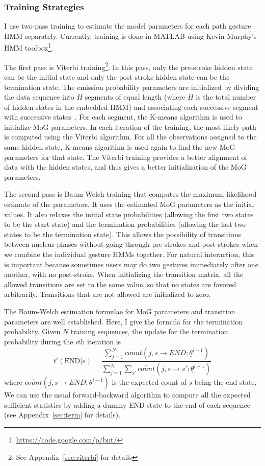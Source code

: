 \subsubsection{Training Strategies}
I use two-pass training to estimate the model parameters for each path
gesture HMM separately. Currently, training is done in MATLAB using Kevin
Murphy's HMM toolbox\footnote{\url{https://code.google.com/p/bnt/}}.

The first pass is Viterbi training\footnote{See Appendix~\ref{sec:viterbi} for
details}.
In this pass, only the pre-stroke hidden state can be the initial state and
only the post-stroke hidden state can be the termination
state. The emission probability parameters are initialized by dividing the data
sequence into $H$ segments of equal length (where $H$ is the total number of
hidden states in the embedded HMM) and associating each successive segment with
successive states~\cite{young1994}. For each segment, the K-means algorithm is used to initialize MoG parameters. In each iteration of the training, the most likely path is computed using the
Viterbi algorithm. For all the observations assigned to the same hidden
state, K-means algorithm is used again to find the new MoG parameters for
that state. The Viterbi training provides a better alignment of data with the
hidden states, and thus gives a better initialization of the MoG parameters. 

The second pass is Baum-Welch training that computes the maximum likelihood
estimate of the parameters.
It uses the estimated MoG parameters as the initial values. It also relaxes the
initial state probabilities (allowing the first two states to be the start
state) and the termination probabilities (allowing the last two states to be the
termination state). This allows the possibility of transitions between nucleus
phases without going through pre-strokes and post-strokes when we combine the
individual gesture HMMs together. For natural interaction, this is important
because sometimes users may do two gestures immediately after one another, with
no post-stroke. When initializing the transition matrix, all the allowed
transitions are set to the same value, so that no states are favored arbitrarily. Transitions that are not allowed are initialized to zero.

The Baum-Welch estimation formulae for MoG parameters and transition parameters
are well established. Here, I give the formula for the termination probability.
Given $N$ training sequences, the update for the termination probability during the $i$th iteration is 
\begin{displaymath}
t^i(\text{END}|s) = \frac{\sum_{j = 1}^N \overline{count}(j, s\rightarrow
END;\underline{\theta}^{i-1})} {\sum_{j = 1}^N\sum_{s'} \overline{count}(j, s\rightarrow s';\underline{\theta}^{i-1})}
\end{displaymath}
where $\overline{count}(j, s\rightarrow END;\underline{\theta}^{i-1})$ is the expected count of 
$s$ being the end state. We can use the usual forward-backward algorithm to compute all the 
expected sufficient statistics by adding a dummy END state to the end of each
sequence (see Appendix~\ref{sec:term} for details).

